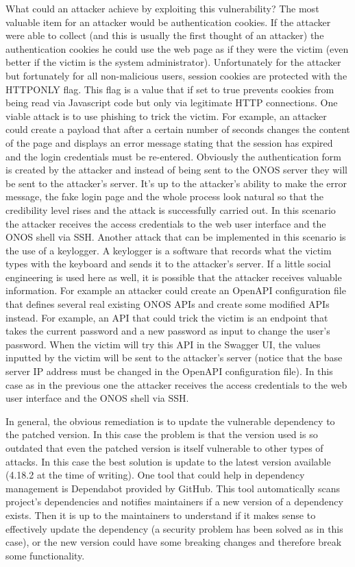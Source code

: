 What could an attacker achieve by exploiting this vulnerability? The most valuable item for an attacker would be authentication cookies. If the attacker were able to collect (and this is usually the first thought of an attacker) the authentication cookies he could use the web page as if they were the victim (even better if the victim is the system administrator). Unfortunately for the attacker but fortunately for all non-malicious users, session cookies are protected with the HTTPONLY flag. This flag is a value that if set to true prevents cookies from being read via Javascript code but only via legitimate HTTP connections. One viable attack is to use phishing to trick the victim. For example, an attacker could create a payload that after a certain number of seconds changes the content of the page and displays an error message stating that the session has expired and the login credentials must be re-entered. Obviously the authentication form is created by the attacker and instead of being sent to the ONOS server they will be sent to the attacker's server. It's up to the attacker's ability to make the error message, the fake login page and the whole process look natural so that the credibility level rises and the attack is successfully carried out. In this scenario the attacker receives the access credentials to the web user interface and the ONOS shell via SSH. Another attack that can be implemented in this scenario is the use of a keylogger. A keylogger is a software that records what the victim types with the keyboard and sends it to the attacker's server. If a little social engineering is used here as well, it is possible that the attacker receives valuable information. For example an attacker could create an OpenAPI configuration file that defines several real existing ONOS APIs and create some modified APIs instead. For example, an API that could trick the victim is an endpoint that takes the current password and a new password as input to change the user's password. When the victim will try this API in the Swagger UI, the values inputted by the victim will be sent to the attacker's server (notice that the base server IP address must be changed in the OpenAPI configuration file). In this case as in the previous one the attacker receives the access credentials to the web user interface and the ONOS shell via SSH.
\medskip

In general, the obvious remediation is to update the vulnerable dependency to the patched version. In this case the problem is that the version used is so outdated that even the patched version is itself vulnerable to other types of attacks. In this case the best solution is update to the latest version available (4.18.2 at the time of writing). One tool that could help in dependency management is Dependabot provided by GitHub. This tool automatically scans project's dependencies and notifies maintainers if a new version of a dependency exists. Then it is up to the maintainers to understand if it makes sense to effectively update the dependency (a security problem has been solved as in this case), or the new version could have some breaking changes and therefore break some functionality.

